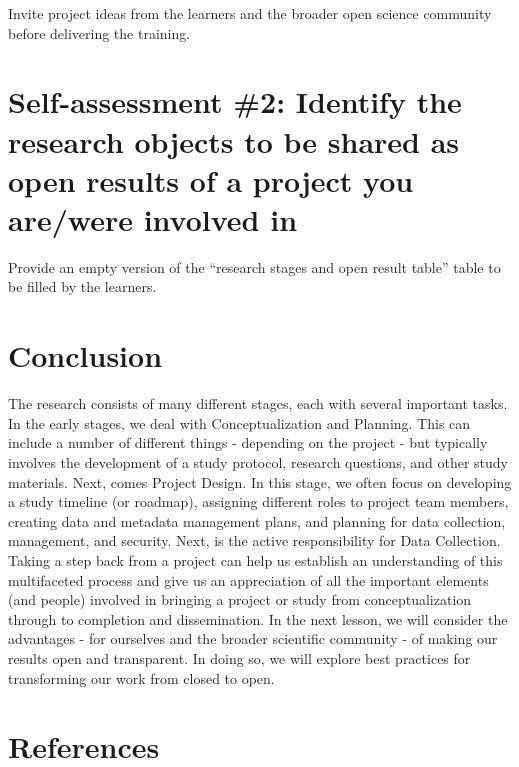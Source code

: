 \documentclass[
  letterpaper,
  DIV=11,
  numbers=noendperiod]{scrreport}
\begin{document}
Invite project ideas from the learners and the broader open science
community before delivering the training.

\hypertarget{self-assessment-2-identify-the-research-objects-to-be-shared-as-open-results-of-a-project-you-arewere-involved-in}{%
\section{Self-assessment \#2: Identify the research objects to be shared
as open results of a project you are/were involved
in}\label{self-assessment-2-identify-the-research-objects-to-be-shared-as-open-results-of-a-project-you-arewere-involved-in}}

Provide an empty version of the ``research stages and open result
table'' table to be filled by the learners.

\hypertarget{conclusion}{%
\section{Conclusion}\label{conclusion}}

The research consists of many different stages, each with several
important tasks. In the early stages, we deal with Conceptualization and
Planning. This can include a number of different things - depending on
the project - but typically involves the development of a study
protocol, research questions, and other study materials. Next, comes
Project Design. In this stage, we often focus on developing a study
timeline (or roadmap), assigning different roles to project team
members, creating data and metadata management plans, and planning for
data collection, management, and security. Next, is the active
responsibility for Data Collection. Taking a step back from a project
can help us establish an understanding of this multifaceted process and
give us an appreciation of all the important elements (and people)
involved in bringing a project or study from conceptualization through
to completion and dissemination. In the next lesson, we will consider
the advantages - for ourselves and the broader scientific community - of
making our results open and transparent. In doing so, we will explore
best practices for transforming our work from closed to open.

\hypertarget{references-7}{%
\section{References}\label{references-7}}
\end{document}

